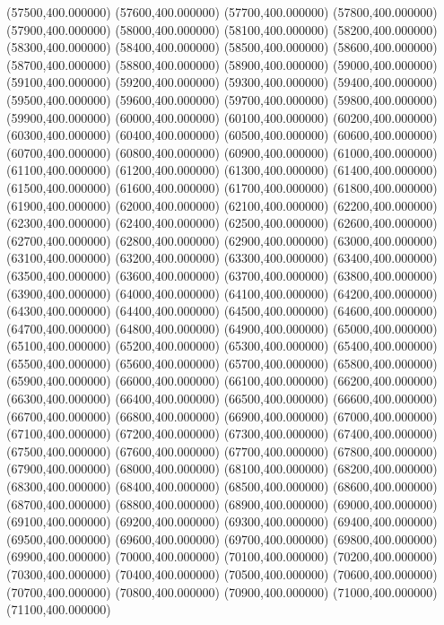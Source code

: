 (57500,400.000000)
(57600,400.000000)
(57700,400.000000)
(57800,400.000000)
(57900,400.000000)
(58000,400.000000)
(58100,400.000000)
(58200,400.000000)
(58300,400.000000)
(58400,400.000000)
(58500,400.000000)
(58600,400.000000)
(58700,400.000000)
(58800,400.000000)
(58900,400.000000)
(59000,400.000000)
(59100,400.000000)
(59200,400.000000)
(59300,400.000000)
(59400,400.000000)
(59500,400.000000)
(59600,400.000000)
(59700,400.000000)
(59800,400.000000)
(59900,400.000000)
(60000,400.000000)
(60100,400.000000)
(60200,400.000000)
(60300,400.000000)
(60400,400.000000)
(60500,400.000000)
(60600,400.000000)
(60700,400.000000)
(60800,400.000000)
(60900,400.000000)
(61000,400.000000)
(61100,400.000000)
(61200,400.000000)
(61300,400.000000)
(61400,400.000000)
(61500,400.000000)
(61600,400.000000)
(61700,400.000000)
(61800,400.000000)
(61900,400.000000)
(62000,400.000000)
(62100,400.000000)
(62200,400.000000)
(62300,400.000000)
(62400,400.000000)
(62500,400.000000)
(62600,400.000000)
(62700,400.000000)
(62800,400.000000)
(62900,400.000000)
(63000,400.000000)
(63100,400.000000)
(63200,400.000000)
(63300,400.000000)
(63400,400.000000)
(63500,400.000000)
(63600,400.000000)
(63700,400.000000)
(63800,400.000000)
(63900,400.000000)
(64000,400.000000)
(64100,400.000000)
(64200,400.000000)
(64300,400.000000)
(64400,400.000000)
(64500,400.000000)
(64600,400.000000)
(64700,400.000000)
(64800,400.000000)
(64900,400.000000)
(65000,400.000000)
(65100,400.000000)
(65200,400.000000)
(65300,400.000000)
(65400,400.000000)
(65500,400.000000)
(65600,400.000000)
(65700,400.000000)
(65800,400.000000)
(65900,400.000000)
(66000,400.000000)
(66100,400.000000)
(66200,400.000000)
(66300,400.000000)
(66400,400.000000)
(66500,400.000000)
(66600,400.000000)
(66700,400.000000)
(66800,400.000000)
(66900,400.000000)
(67000,400.000000)
(67100,400.000000)
(67200,400.000000)
(67300,400.000000)
(67400,400.000000)
(67500,400.000000)
(67600,400.000000)
(67700,400.000000)
(67800,400.000000)
(67900,400.000000)
(68000,400.000000)
(68100,400.000000)
(68200,400.000000)
(68300,400.000000)
(68400,400.000000)
(68500,400.000000)
(68600,400.000000)
(68700,400.000000)
(68800,400.000000)
(68900,400.000000)
(69000,400.000000)
(69100,400.000000)
(69200,400.000000)
(69300,400.000000)
(69400,400.000000)
(69500,400.000000)
(69600,400.000000)
(69700,400.000000)
(69800,400.000000)
(69900,400.000000)
(70000,400.000000)
(70100,400.000000)
(70200,400.000000)
(70300,400.000000)
(70400,400.000000)
(70500,400.000000)
(70600,400.000000)
(70700,400.000000)
(70800,400.000000)
(70900,400.000000)
(71000,400.000000)
(71100,400.000000)

